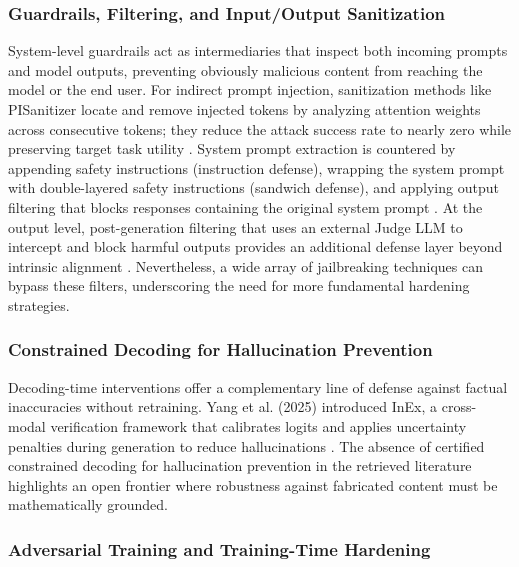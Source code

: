 \documentclass[11pt,a4paper]{article}
\begin{document}
\subsubsection{Guardrails, Filtering, and Input/Output Sanitization}

System-level guardrails act as intermediaries that inspect both incoming prompts and model outputs, preventing obviously malicious content from reaching the model or the end user. For indirect prompt injection, sanitization methods like PISanitizer locate and remove injected tokens by analyzing attention weights across consecutive tokens; they reduce the attack success rate to nearly zero while preserving target task utility \cite{Geng_2025_LLMs_16cfd21e}. System prompt extraction is countered by appending safety instructions (instruction defense), wrapping the system prompt with double-layered safety instructions (sandwich defense), and applying output filtering that blocks responses containing the original system prompt \cite{Das_2025_System_cda316c4}. At the output level, post-generation filtering that uses an external Judge LLM to intercept and block harmful outputs provides an additional defense layer beyond intrinsic alignment \cite{Arazzi_2026_Securebreak_0e3adcf7}. Nevertheless, a wide array of jailbreaking techniques can bypass these filters, underscoring the need for more fundamental hardening strategies.

\subsubsection{Constrained Decoding for Hallucination Prevention}

Decoding-time interventions offer a complementary line of defense against factual inaccuracies without retraining. Yang et al. (2025) introduced InEx, a cross-modal verification framework that calibrates logits and applies uncertainty penalties during generation to reduce hallucinations \cite{Yang_2025_Inex_187a262a}. The absence of certified constrained decoding for hallucination prevention in the retrieved literature highlights an open frontier where robustness against fabricated content must be mathematically grounded.

\subsubsection{Adversarial Training and Training-Time Hardening}
\end{document}
